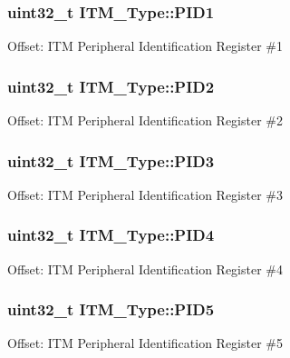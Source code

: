 \subsubsection[{\texorpdfstring{P\+I\+D1}{PID1}}]{ uint32\+\_\+t I\+T\+M\+\_\+\+Type\+::\+P\+I\+D1}\hypertarget{structITM__Type_a30e87ec6f93ecc9fe4f135ca8b068990}{}\label{structITM__Type_a30e87ec6f93ecc9fe4f135ca8b068990}
Offset\+: I\+TM Peripheral Identification Register \#1 
\subsubsection[{\texorpdfstring{P\+I\+D2}{PID2}}]{ uint32\+\_\+t I\+T\+M\+\_\+\+Type\+::\+P\+I\+D2}\hypertarget{structITM__Type_ae139d2e588bb382573ffcce3625a88cd}{}\label{structITM__Type_ae139d2e588bb382573ffcce3625a88cd}
Offset\+: I\+TM Peripheral Identification Register \#2 
\subsubsection[{\texorpdfstring{P\+I\+D3}{PID3}}]{ uint32\+\_\+t I\+T\+M\+\_\+\+Type\+::\+P\+I\+D3}\hypertarget{structITM__Type_af006ee26c7e61c9a3712a80ac74a6cf3}{}\label{structITM__Type_af006ee26c7e61c9a3712a80ac74a6cf3}
Offset\+: I\+TM Peripheral Identification Register \#3 
\subsubsection[{\texorpdfstring{P\+I\+D4}{PID4}}]{ uint32\+\_\+t I\+T\+M\+\_\+\+Type\+::\+P\+I\+D4}\hypertarget{structITM__Type_accfc7de00b0eaba0301e8f4553f70512}{}\label{structITM__Type_accfc7de00b0eaba0301e8f4553f70512}
Offset\+: I\+TM Peripheral Identification Register \#4 
\subsubsection[{\texorpdfstring{P\+I\+D5}{PID5}}]{ uint32\+\_\+t I\+T\+M\+\_\+\+Type\+::\+P\+I\+D5}\hypertarget{structITM__Type_a9353055ceb7024e07d59248e54502cb9}{}\label{structITM__Type_a9353055ceb7024e07d59248e54502cb9}
Offset\+: I\+TM Peripheral Identification Register \#5 

